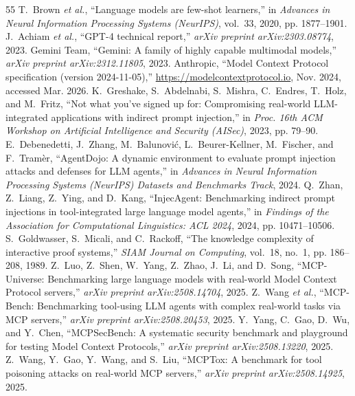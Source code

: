 \documentclass[conference,10pt]{IEEEtran}
\begin{document}
\begin{thebibliography}{55}
 T.~Brown \textit{et al.}, ``Language models are few-shot learners,'' in \textit{Advances in Neural Information Processing Systems (NeurIPS)}, vol.~33, 2020, pp. 1877--1901.
 J.~Achiam \textit{et al.}, ``GPT-4 technical report,'' \textit{arXiv preprint arXiv:2303.08774}, 2023.
 Gemini Team, ``Gemini: A family of highly capable multimodal models,'' \textit{arXiv preprint arXiv:2312.11805}, 2023.
 Anthropic, ``Model Context Protocol specification (version 2024-11-05),'' \url{https://modelcontextprotocol.io}, Nov. 2024, accessed Mar. 2026.
 K.~Greshake, S.~Abdelnabi, S.~Mishra, C.~Endres, T.~Holz, and M.~Fritz, ``Not what you've signed up for: Compromising real-world LLM-integrated applications with indirect prompt injection,'' in \textit{Proc. 16th ACM Workshop on Artificial Intelligence and Security (AISec)}, 2023, pp. 79--90.
 E.~Debenedetti, J.~Zhang, M.~Balunovi{\'c}, L.~Beurer-Kellner, M.~Fischer, and F.~Tram{\`e}r, ``AgentDojo: A dynamic environment to evaluate prompt injection attacks and defenses for LLM agents,'' in \textit{Advances in Neural Information Processing Systems (NeurIPS) Datasets and Benchmarks Track}, 2024.
 Q.~Zhan, Z.~Liang, Z.~Ying, and D.~Kang, ``InjecAgent: Benchmarking indirect prompt injections in tool-integrated large language model agents,'' in \textit{Findings of the Association for Computational Linguistics: ACL 2024}, 2024, pp. 10471--10506.
 S.~Goldwasser, S.~Micali, and C.~Rackoff, ``The knowledge complexity of interactive proof systems,'' \textit{SIAM Journal on Computing}, vol.~18, no.~1, pp. 186--208, 1989.
 Z.~Luo, Z.~Shen, W.~Yang, Z.~Zhao, J.~Li, and D.~Song, ``MCP-Universe: Benchmarking large language models with real-world Model Context Protocol servers,'' \textit{arXiv preprint arXiv:2508.14704}, 2025.
 Z.~Wang \textit{et al.}, ``MCP-Bench: Benchmarking tool-using LLM agents with complex real-world tasks via MCP servers,'' \textit{arXiv preprint arXiv:2508.20453}, 2025.
 Y.~Yang, C.~Gao, D.~Wu, and Y.~Chen, ``MCPSecBench: A systematic security benchmark and playground for testing Model Context Protocols,'' \textit{arXiv preprint arXiv:2508.13220}, 2025.
 Z.~Wang, Y.~Gao, Y.~Wang, and S.~Liu, ``MCPTox: A benchmark for tool poisoning attacks on real-world MCP servers,'' \textit{arXiv preprint arXiv:2508.14925}, 2025.

\end{thebibliography}
\end{document}
